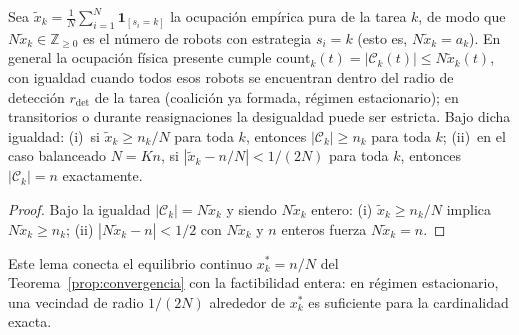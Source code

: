 \begin{lema}
\label{lema:entero}
Sea $\tilde{x}_k = \tfrac{1}{N}\sum_{i=1}^N \mathbf{1}_{[s_i = k]}$ la ocupación
empírica pura de la tarea $k$, de modo que $N\tilde{x}_k \in \mathbb{Z}_{\geq 0}$ es
el número de robots con estrategia $s_i = k$ (esto es, $N\tilde{x}_k = a_k$). En
general la ocupación física presente cumple
$\mathrm{count}_k(t) = |\mathcal{C}_k(t)| \leq N\tilde{x}_k(t)$, con igualdad cuando todos esos robots se
encuentran dentro del radio de detección $r_{\mathrm{det}}$ de la tarea (coalición ya
formada, régimen estacionario); en transitorios o durante reasignaciones la
desigualdad puede ser estricta. Bajo dicha igualdad:
\textup{(i)}~si $\tilde{x}_k \geq n_k/N$ para toda $k$, entonces
$|\mathcal{C}_k| \geq n_k$ para toda $k$;
\textup{(ii)}~en el caso balanceado $N = Kn$, si $|\tilde{x}_k - n/N| < 1/(2N)$
para toda $k$, entonces $|\mathcal{C}_k| = n$ exactamente.
\end{lema}
\begin{proof}
Bajo la igualdad $|\mathcal{C}_k| = N\tilde{x}_k$ y siendo $N\tilde{x}_k$ entero:
(i) $\tilde{x}_k \geq n_k/N$ implica $N\tilde{x}_k \geq n_k$; (ii) $|N\tilde{x}_k - n| < 1/2$
con $N\tilde{x}_k$ y $n$ enteros fuerza $N\tilde{x}_k = n$.
\end{proof}
Este lema conecta el equilibrio continuo $x_k^* = n/N$ del
Teorema~\ref{prop:convergencia} con la factibilidad entera: en régimen estacionario,
una vecindad de radio $1/(2N)$ alrededor de $x_k^*$ es suficiente para la cardinalidad
exacta.

